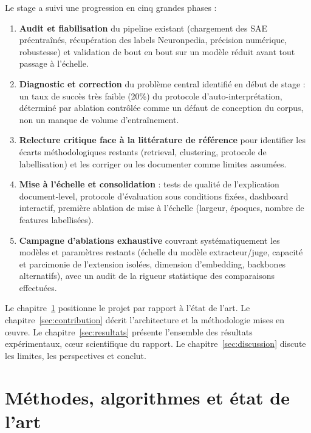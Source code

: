 \documentclass[11pt]{article}
\begin{document}
Le stage a suivi une progression en cinq grandes phases :

\begin{enumerate}
  \item \textbf{Audit et fiabilisation} du pipeline existant (chargement des
    SAE préentraînés, récupération des labels Neuronpedia, précision
    numérique, robustesse) et validation de bout en bout sur un modèle réduit
    avant tout passage à l'échelle.
  \item \textbf{Diagnostic et correction} du problème central identifié en
    début de stage : un taux de succès très faible (20\%) du protocole
    d'auto-interprétation, déterminé par ablation contrôlée comme un défaut de
    conception du corpus, non un manque de volume d'entraînement.
  \item \textbf{Relecture critique face à la littérature de référence} pour
    identifier les écarts méthodologiques restants (retrieval, clustering,
    protocole de labellisation) et les corriger ou les documenter comme
    limites assumées.
  \item \textbf{Mise à l'échelle et consolidation} : tests de qualité de
    l'explication document-level, protocole d'évaluation sous conditions
    fixées, dashboard interactif, première ablation de mise à l'échelle
    (largeur, époques, nombre de features labellisées).
  \item \textbf{Campagne d'ablations exhaustive} couvrant systématiquement les
    modèles et paramètres restants (échelle du modèle extracteur/juge,
    capacité et parcimonie de l'extension isolées, dimension d'embedding,
    backbones alternatifs), avec un audit de la rigueur statistique des
    comparaisons effectuées.
\end{enumerate}

Le chapitre~\ref{sec:etat-art} positionne le projet par rapport à l'état de
l'art. Le chapitre~\ref{sec:contribution} décrit l'architecture et la
méthodologie mises en œuvre. Le chapitre~\ref{sec:resultats} présente
l'ensemble des résultats expérimentaux, cœur scientifique du rapport. Le
chapitre~\ref{sec:discussion} discute les limites, les perspectives et conclut.

\newpage
\section{Méthodes, algorithmes et état de l'art}
\label{sec:etat-art}
\end{document}
